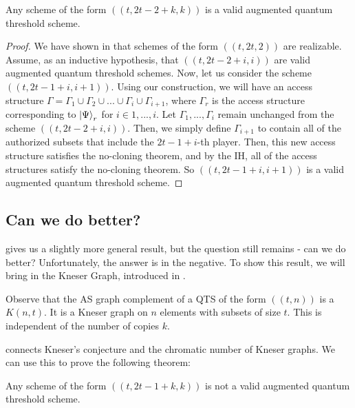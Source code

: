 \begin{theorem}
    \label{thm:build-scheme} 
    Any scheme of the form $((t,2t-2+k,k))$ is a valid augmented quantum threshold scheme.
\end{theorem}

\begin{proof}
    We have shown in  that schemes of the form $((t, 2t, 2))$ are realizable. Assume, as an inductive hypothesis, that $((t, 2t - 2 + i, i))$ are valid augmented quantum threshold schemes. Now, let us consider the scheme $((t, 2t-1+i, i+1))$. Using our construction, we will have an access structure $\Gamma = \Gamma_1 \cup \Gamma_2 \cup ... \cup \Gamma_i \cup \Gamma_{i+1}$, where $\Gamma_r$ is the access structure corresponding to $\ket{\Psi}_r$ for $i \in {1,...,i}$. Let $\Gamma_1, ..., \Gamma_i$ remain unchanged from the scheme $((t, 2t - 2 + i, i))$. Then, we simply define $\Gamma_{i+1}$ to contain all of the authorized subsets that include the $2t-1+i$-th player. Then, this new access structure satisfies the no-cloning theorem, and by the IH, all of the access structures satisfy the no-cloning theorem. So $((t, 2t-1+i, i+1))$ is a valid augmented quantum threshold scheme.
\end{proof}

\subsection{Can we do better?}
\label{ssec:better}

 gives us a slightly more general result, but the question still remains - can we do better? Unfortunately, the answer is in the negative. To show this result, we will bring in the Kneser Graph, introduced in .

\begin{remark}
    Observe that the AS graph complement of a QTS of the form $((t,n))$ is a $K(n,t)$. It is a Kneser graph on $n$ elements with subsets of size $t$. This is independent of the number of copies $k$.
\end{remark}

 connects Kneser's conjecture and the chromatic number of Kneser graphs. We can use this to prove the following theorem:

\begin{theorem}
    \label{thm:no-more} 
    Any scheme of the form $((t,2t-1+k,k))$ is not a valid augmented quantum threshold scheme.
\end{theorem}

